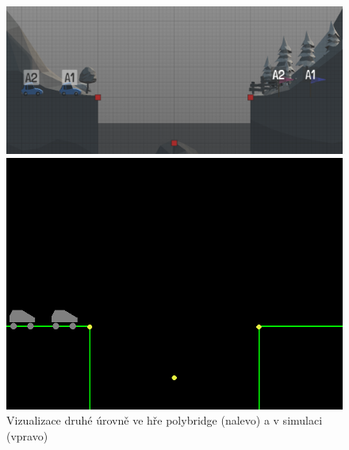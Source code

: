 \begin{figure}[ht]
    \centering
    \begin{minipage}{0.49\textwidth}
        \centering
        \includegraphics[width=\linewidth]{img/poly_lvl2.png}
    \end{minipage}\hfill
    \begin{minipage}{0.49\textwidth}
        \centering
        \includegraphics[width=\linewidth]{img/impl_lvl2.png}
    \end{minipage}
    \caption{Vizualizace druhé úrovně ve hře polybridge (nalevo) a v simulaci (vpravo)}
    \label{fig:3}
\end{figure}

